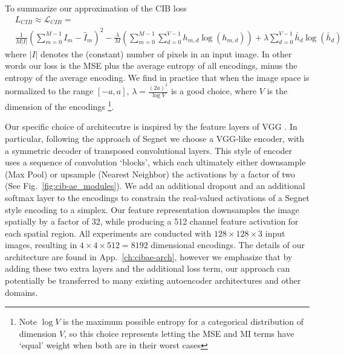 To summarize our approximation of the CIB loss
\begin{equation}
\begin{split}
& L_{CIB} \approx \mathcal{L}_{CIB} =\\
&  \frac{1}{M |I|} \left( \sum_{m=0}^{M-1} I_m - \hat{I}_m \right)^2
- \frac{\lambda}{M} \left( \sum_{m=0}^{M-1} \sum_{d=0}^{V-1} h_{m,d}\log(h_{m,d}) \right)
+ \lambda \sum_{d=0}^{V-1} \bar{h}_{d}\log(\bar{h}_{d})
\end{split}
\end{equation}
where $|I|$ denotes the (constant) number of pixels in an input image. In other words our loss is the MSE plus the average entropy of all encodings, minus the entropy of the average encoding. We find in practice that when the image space is normalized to the range $[-a,a]$, $\lambda = \frac{(2a)^2}{\log V}$ is a good choice, where $V$ is the dimension of the encodings \footnote{Note $\log V$ is the maximum possible entropy for a categorical distribution of dimension $V$, so this choice represents letting the MSE and MI terms have `equal' weight when both are in their worst cases}.

Our specific choice of architecutre is inspired by the feature layers of VGG \citep{Simonyan14c}. In particular, following the approach of Segnet \citep{BadrinarayananK15} we choose a VGG-like encoder, with a symmetric decoder of transposed convolutional layers. This style of encoder uses a sequence of convolution `blocks', which each ultimately either downsample (Max Pool) or upsample (Nearest Neighbor) the activations by a factor of two (See Fig.~\ref{fig:cib-ae_modules}). We add an additional dropout and an additional softmax layer to the encodings to constrain the real-valued activations of a Segnet style encoding to a simplex. Our feature representation downsamples the image spatially by a factor of 32, while producing a 512 channel feature activation for each spatial region. All experiments are conducted with $128 \times 128 \times 3$ input images, resulting in $4 \times 4 \times 512 = 8192$ dimensional encodings. The details of our architecture are found in App.~\ref{ch:cibae-arch}, however we emphasize that by adding these two extra layers and the additional loss term, our approach can potentially be transferred to many existing autoencoder architectures and other domains.


